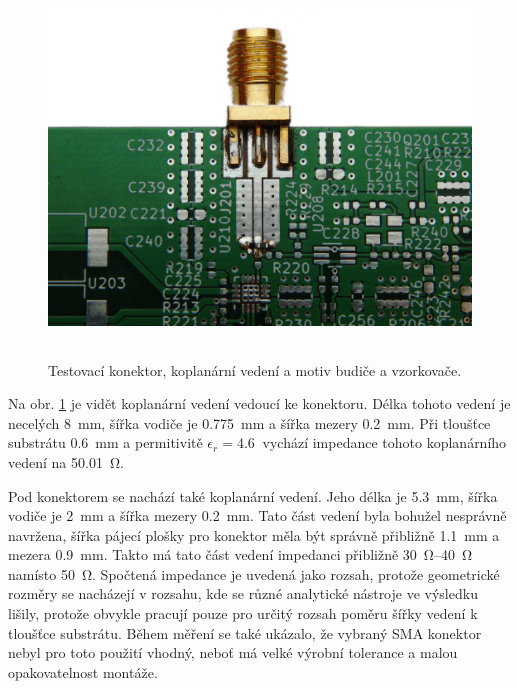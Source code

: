 \begin{figure}[htbp]
\includegraphics[width=\textwidth,height=10cm,keepaspectratio]{images/pcb/pcb_coplanar.jpg}\caption{Testovací konektor, koplanární vedení a motiv budiče a vzorkovače.}\label{pcb_coplanar}
\end{figure}

Na obr. \ref{pcb_coplanar} je vidět koplanární vedení vedoucí ke konektoru. Délka tohoto vedení je necelých \SI{8}{\milli\meter}, šířka vodiče je \SI{0.775}{\milli\meter} a šířka mezery \SI{0.2}{\milli\meter}. Při tloušťce substrátu \SI{0.6}{\milli\meter} a permitivitě $\epsilon _r= \SI{4.6}{}$ vychází impedance tohoto koplanárního vedení na \SI{50.01}{\ohm}.

Pod konektorem se nachází také koplanární vedení. Jeho délka je \SI{5.3}{\milli\meter}, šířka vodiče je \SI{2}{\milli\meter} a šířka mezery \SI{0.2}{\milli\meter}. Tato část vedení byla bohužel nesprávně navržena, šířka pájecí plošky pro konektor měla být správně přibližně \SI{1.1}{\milli\meter} a mezera \SI{0.9}{\milli\meter}. Takto má tato část vedení impedanci přibližně \SIrange{30}{40}{\ohm} namísto \SI{50}{\ohm}. Spočtená impedance je uvedená jako rozsah, protože geometrické rozměry se nacházejí v rozsahu, kde se různé analytické nástroje ve výsledku lišily, protože obvykle pracují pouze pro určitý rozsah poměru šířky vedení k tloušťce substrátu. Během měření se také ukázalo, že vybraný SMA konektor nebyl pro toto použití vhodný, neboť má velké výrobní tolerance a malou opakovatelnost montáže.

